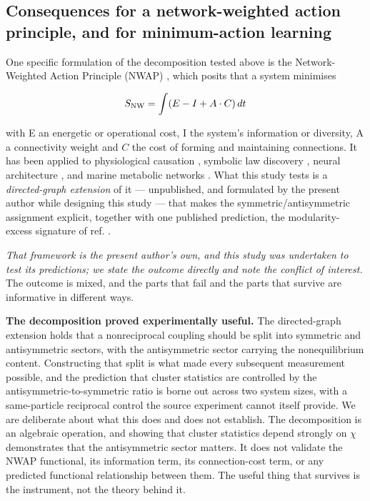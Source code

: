 \documentclass[aps,pre,preprint,superscriptaddress,nofootinbib,longbibliography]{revtex4-2}
\begin{document}
\subsection{Consequences for a network-weighted action principle, and for minimum-action learning}

One specific formulation of the decomposition tested above is the Network-Weighted Action Principle (NWAP) \cite{r9,r33}, which posits that a system minimises

\begin{equation}
S_{\rm NW}=\int (E-I+A\cdot C)\,dt
\end{equation}

with E an energetic or operational cost, I the system's information or diversity, A a connectivity weight and $C$ the cost of forming and maintaining connections. It has been applied to physiological causation \cite{r9}, symbolic law discovery \cite{r31}, neural architecture \cite{r32}, and marine metabolic networks \cite{r30}. What this study tests is a \emph{directed-graph extension} of it --- unpublished, and formulated by the present author while designing this study --- that makes the symmetric/antisymmetric assignment explicit, together with one published prediction, the modularity-excess signature of ref. \cite{r30}.

\emph{That framework is the present author's own, and this study was undertaken to test its predictions; we state the outcome directly and note the conflict of interest.} The outcome is mixed, and the parts that fail and the parts that survive are informative in different ways.

\textbf{The decomposition proved experimentally useful.} The directed-graph extension holds that a nonreciprocal coupling should be split into symmetric and antisymmetric sectors, with the antisymmetric sector carrying the nonequilibrium content. Constructing that split is what made every subsequent measurement possible, and the prediction that cluster statistics are controlled by the antisymmetric-to-symmetric ratio is borne out across two system sizes, with a same-particle reciprocal control the source experiment cannot itself provide. We are deliberate about what this does and does not establish. The decomposition is an algebraic operation, and showing that cluster statistics depend strongly on $\chi$ demonstrates that the antisymmetric sector matters. It does not validate the NWAP functional, its information term, its connection-cost term, or any predicted functional relationship between them. The useful thing that survives is the instrument, not the theory behind it.
\end{document}

